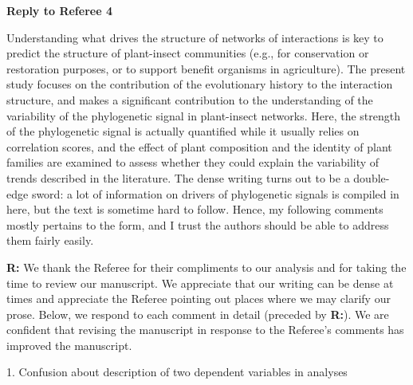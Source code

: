 \documentclass[12pt]{letter}
\newenvironment{refquote}{\bigskip \begin{it}}{\end{it}\smallskip}
\begin{document}
\clearpage


{\Large \bf Reply to Referee 4}

	\begin{refquote}
		Understanding what drives the structure of networks of interactions is key to predict the structure of plant-insect communities (e.g., for conservation or restoration purposes, or to support benefit organisms in agriculture).
		The present study focuses on the contribution of the evolutionary history to the interaction structure, and makes a significant contribution to the understanding of the variability of the phylogenetic signal in plant-insect networks. Here, the strength of the phylogenetic signal is actually quantified while it usually relies on correlation scores, and the effect of plant composition and the identity of plant families are examined to assess whether they could explain the variability of trends described in the literature.
		The dense writing turns out to be a double-edge sword: a lot of information on drivers of phylogenetic signals is compiled in here, but the text is sometime hard to follow. Hence, my following comments mostly pertains to the form, and I trust the authors should be able to address them fairly easily.
	\end{refquote}


	\textbf{R:} We thank the Referee for their compliments to our analysis and for taking the time to review our manuscript. We appreciate that our writing can be dense at times and appreciate the Referee pointing out places where we may clarify our prose. Below, we respond to each comment in detail (preceded by \textbf{R:}). We are confident that revising the manuscript in response to the Referee's comments has improved the manuscript.


1. Confusion about description of two dependent variables in analyses
\end{document}
